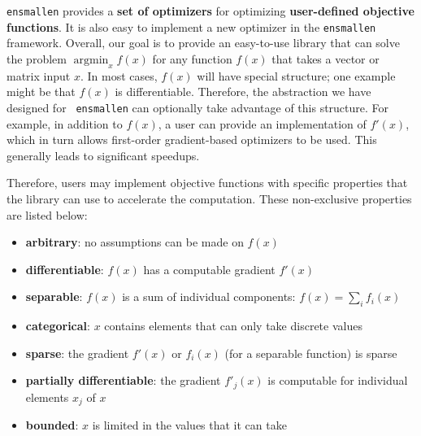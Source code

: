 \documentclass{article}
\DeclareMathOperator{\argminright}{argmin}   %
\begin{document}
{\tt ensmallen} provides a {\bf set of optimizers} for
optimizing {\bf user-defined objective functions}.  It is also easy to implement a
new optimizer in the {\tt ensmallen} framework.  Overall, our goal is to provide
an easy-to-use library that can solve the problem
$\argminright_{x} f(x)$
for any function $f(x)$ that takes a vector or matrix input $x$.
In most cases, $f(x)$ will have special structure; one example might be that
$f(x)$ is differentiable.  Therefore, the abstraction we have designed for {\tt
ensmallen} can optionally take advantage of this structure.  For example, in
addition to $f(x)$, a user can provide an implementation of $f'(x)$, which in
turn allows first-order gradient-based optimizers to be used.  This generally
leads to significant speedups.




Therefore, users may implement objective functions with specific properties that
the library can use to accelerate the computation.  These non-exclusive
properties are listed below:

\vspace*{-0.3em}
\begin{itemize} \itemsep -1pt
  \item {\bf arbitrary}: no assumptions can be made on $f(x)$
  \item {\bf differentiable}: $f(x)$ has a computable gradient $f'(x)$
  \item {\bf separable}: $f(x)$ is a sum of individual components: $f(x) =
\sum_{i} f_i(x)$
  \item {\bf categorical}: $x$ contains elements that can only take discrete
values
  \item {\bf sparse}: the gradient $f'(x)$ or $f_i(x)$ (for a separable
function) is sparse
  \item {\bf partially differentiable}: the gradient $f'_j(x)$ is computable for
individual elements $x_j$ of $x$
  \item {\bf bounded}: $x$ is limited in the values that it can take
\end{itemize}
\vspace*{-0.3em}
\end{document}
